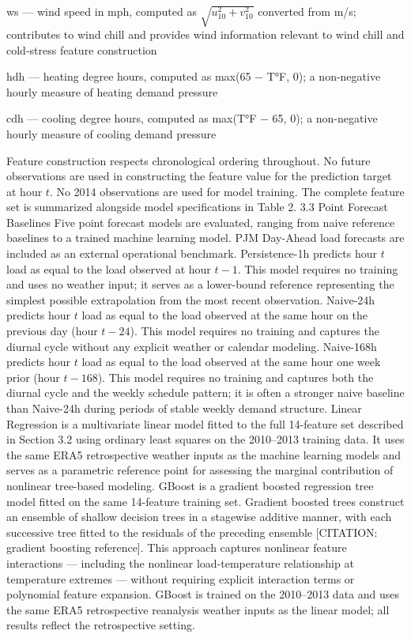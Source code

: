 ws — wind speed in mph, computed as $\sqrt{u_{10}^2 + v_{10}^2}$ converted from m/s; contributes to wind chill and provides wind information relevant to wind chill and cold-stress feature construction


hdh — heating degree hours, computed as max(65 $-$ T°F, 0); a non-negative hourly measure of heating demand pressure


cdh — cooling degree hours, computed as max(T°F $-$ 65, 0); a non-negative hourly measure of cooling demand pressure


Feature construction respects chronological ordering throughout. No future observations are used in constructing the feature value for the prediction target at hour $t$. No 2014 observations are used for model training. The complete feature set is summarized alongside model specifications in Table 2.
3.3 Point Forecast Baselines
Five point forecast models are evaluated, ranging from naive reference baselines to a trained machine learning model. PJM Day-Ahead load forecasts are included as an external operational benchmark.
Persistence-1h predicts hour $t$ load as equal to the load observed at hour $t - 1$. This model requires no training and uses no weather input; it serves as a lower-bound reference representing the simplest possible extrapolation from the most recent observation.
Naive-24h predicts hour $t$ load as equal to the load observed at the same hour on the previous day (hour $t - 24$). This model requires no training and captures the diurnal cycle without any explicit weather or calendar modeling.
Naive-168h predicts hour $t$ load as equal to the load observed at the same hour one week prior (hour $t - 168$). This model requires no training and captures both the diurnal cycle and the weekly schedule pattern; it is often a stronger naive baseline than Naive-24h during periods of stable weekly demand structure.
Linear Regression is a multivariate linear model fitted to the full 14-feature set described in Section 3.2 using ordinary least squares on the 2010–2013 training data. It uses the same ERA5 retrospective weather inputs as the machine learning models and serves as a parametric reference point for assessing the marginal contribution of nonlinear tree-based modeling.
GBoost is a gradient boosted regression tree model fitted on the same 14-feature training set. Gradient boosted trees construct an ensemble of shallow decision trees in a stagewise additive manner, with each successive tree fitted to the residuals of the preceding ensemble [CITATION: gradient boosting reference]. This approach captures nonlinear feature interactions — including the nonlinear load-temperature relationship at temperature extremes — without requiring explicit interaction terms or polynomial feature expansion. GBoost is trained on the 2010–2013 data and uses the same ERA5 retrospective reanalysis weather inputs as the linear model; all results reflect the retrospective setting.
